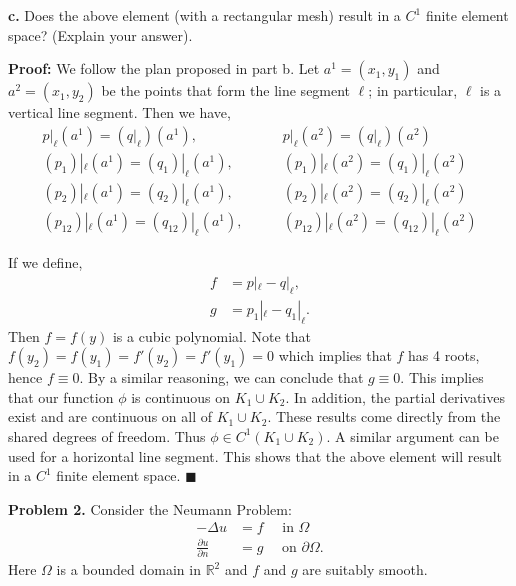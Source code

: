 \documentclass[11pt]{article}
\begin{document}
\vskip 2cm




{\bf c.} Does the above element (with a rectangular mesh) result in a $C^1$ finite element space? (Explain your answer).


\vskip 1cm

\textbf{Proof:} We follow the plan proposed in part b.
Let $a^1 = (x_1, y_1)$ and $a^2 = (x_1, y_2)$ be the points that form the line segment $\ell$; in particular, $\ell$ is a vertical line segment. 
Then we have,
\begin{align*}
	p|_\ell(a^1) = (q|_\ell)(a^1), &\qquad p|_\ell(a^2) = (q|_\ell)(a^2) \\
	(p_1)|_\ell(a^1) = (q_1)|_\ell(a^1), &\qquad (p_1)|_\ell(a^2) = (q_1)|_\ell(a^2) \\
	(p_2)|_\ell(a^1) = (q_2)|_\ell(a^1), &\qquad (p_2)|_\ell(a^2) = (q_2)|_\ell(a^2) \\
	(p_{12})|_\ell(a^1) = (q_{12})|_\ell(a^1), &\qquad (p_{12})|_\ell(a^2) = (q_{12})|_\ell(a^2)
\end{align*}

If we define,
\begin{align*}
    	f &= p|_\ell - q|_\ell, \\
    	g &= p_1|_\ell - q_1|_\ell.
\end{align*}
Then $f = f(y)$ is a cubic polynomial.
Note that $f(y_2) = f(y_1) = f'(y_2) = f'(y_1) = 0$ which implies that $f$ has 4 roots, hence $f \equiv 0$.
By a similar reasoning, we can conclude that $g \equiv 0$.
This implies that our function $\phi$ is continuous on $K_1 \cup K_2$.
In addition, the partial derivatives exist and are continuous on all of $K_1 \cup K_2$. 
These results come directly from the shared degrees of freedom.
Thus $\phi \in C^1(K_1 \cup K_2)$.
A similar argument can be used for a horizontal line segment. 
This shows that the above element will result in a $C^1$ finite element space.
$\blacksquare$


\vskip 2cm





\textbf{Problem 2.} Consider the Neumann Problem:
\begin{align} \label{pb2:eqs}
    -\Delta u &= f \quad \text{ in } \Omega \\
    \frac{\partial u}{\partial n} &= g \quad \text{ on } \partial \Omega.
\end{align}
Here $\Omega$ is a bounded domain in $\mathbb{R}^2$ and $f$ and $g$ are suitably smooth.
\end{document}
